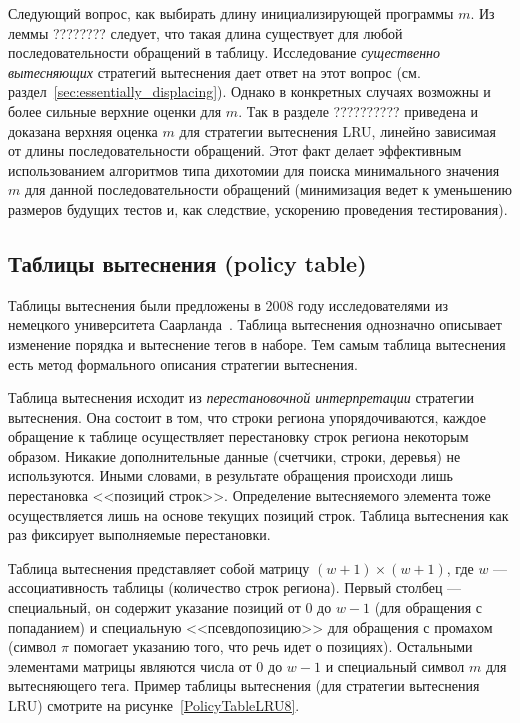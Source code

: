 \documentclass[14pt]{extreport}
\newcommand{\LRU}{\textsf{LRU}\xspace}
\begin{document}
Следующий вопрос, как выбирать длину инициализирующей программы $m$. Из леммы ???????? следует, что такая длина существует для любой последовательности обращений в таблицу. Исследование \emph{существенно вытесняющих} стратегий вытеснения дает ответ на этот вопрос (см. раздел~\ref{sec:essentially_displacing}). Однако в конкретных случаях возможны и более сильные верхние оценки для $m$. Так в разделе ?????????? приведена и доказана верхняя оценка $m$ для стратегии вытеснения \LRU, линейно зависимая от длины последовательности обращений. Этот факт делает эффективным использованием алгоритмов типа дихотомии для поиска минимального значения $m$ для данной последовательности обращений (минимизация ведет к уменьшению размеров будущих тестов и, как следствие, ускорению проведения тестирования).

\subsection{Таблицы вытеснения (policy table)}

Таблицы вытеснения были предложены в 2008 году исследователями из немецкого
университета Саарланда~\cite{policy_tables}. Таблица вытеснения
однозначно описывает изменение порядка и вытеснение тегов в наборе. Тем самым таблица вытеснения есть метод формального описания стратегии вытеснения.

Таблица вытеснения исходит из \emph{перестановочной интерпретации} стратегии вытеснения. Она состоит в том, что строки региона упорядочиваются, каждое обращение к таблице осуществляет перестановку строк региона некоторым образом. Никакие дополнительные данные (счетчики, строки, деревья) не используются. Иными словами, в результате обращения происходи лишь перестановка <<позиций строк>>. Определение вытесняемого элемента тоже осуществляется лишь на основе текущих позиций строк. Таблица вытеснения как раз фиксирует выполняемые перестановки.

Таблица вытеснения представляет собой матрицу $(w{+}1) \times (w{+}1)$, где $w$
--- ассоциативность таблицы (количество строк региона). Первый столбец ---
специальный, он содержит указание позиций от 0 до $w{-}1$ (для обращения с попаданием) и
специальную <<псевдопозицию>> для обращения с промахом (символ $\pi$ помогает указанию того, что речь идет о позициях). Остальными элементами
матрицы являются числа от 0 до $w{-}1$ и специальный символ $m$ для
вытесняющего тега. Пример таблицы вытеснения (для стратегии
вытеснения \LRU) смотрите на рисунке~\ref{PolicyTableLRU8}.
\end{document}

